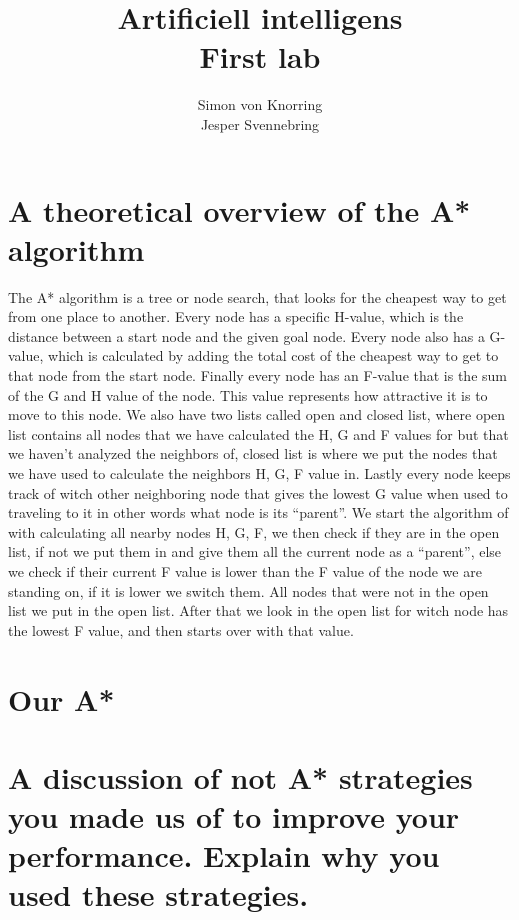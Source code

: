 \documentclass[12pt, a4paper]{article}
\title{Artificiell intelligens\\First lab}
\author{Simon von Knorring\\Jesper Svennebring}
\begin{document}
\maketitle

\newpage
\section{A theoretical overview of the A* algorithm}
The A* algorithm is a tree or node search, that looks for the cheapest way to get from one place to another.
Every node has a specific H-value, which is the distance between a start node and the given goal node.
Every node also has a G-value, which is calculated by adding the total cost of the cheapest way to get to that node from the start node.
Finally every node has an F-value that is the sum of the G and H value of the node. This value represents how attractive it is to move to this node.
We also have two lists called open and closed list, where open list contains all nodes that we have calculated the H, G and F values for but that we haven’t analyzed the neighbors of, closed list is where we put the nodes that we have used to calculate the neighbors H, G, F value in.
Lastly every node keeps track of witch other neighboring node that gives the lowest G value when used to traveling to it in other words what node is its “parent”. 
We start the algorithm of with calculating all nearby nodes H, G, F, we then check if they are in the open list, if not we put them in and give them all the current node as a “parent”, else we check if their current F value is lower than the F value of the node we are standing on, if it is lower we switch them. All nodes that were not in the open list we put in the open list. After that we look in the open list for witch node has the lowest F value, and then starts over with that value. 


\section{Our A*}




\section{A discussion of not A* strategies you made us of to improve your performance. Explain why you used these strategies.}
\end{document}
